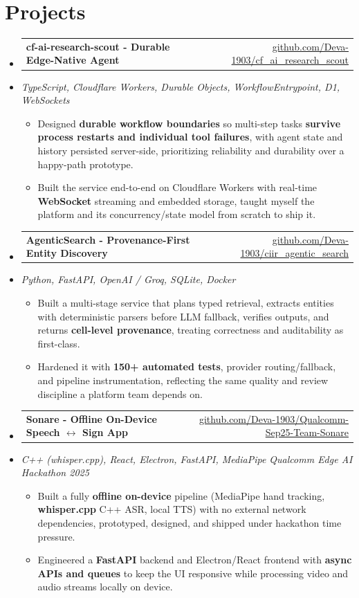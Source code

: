 \documentclass[letterpaper,10pt]{article}
\makeatletter
\newcommand{\resumeItem}[1]{
  \item\small{#1\vspace{-1pt}}
}
\newcommand{\resumeProjectHeading}[2]{
    \item
    \begin{tabular*}{0.985\textwidth}[t]{l@{\extracolsep{\fill}}r}
      \small\textbf{#1} & \small #2 \\
    \end{tabular*}\vspace{-5pt}
}
\newcommand{\resumeProjectSubheading}[1]{
  \vspace{-2pt}\item[] {\small\textcolor{ResumeSlate}{\emph{#1}}}\vspace{-3pt}
}
\newcommand{\resumeSubHeadingListStart}{\begin{itemize}[leftmargin=0.0in, label={}, itemsep=2pt, topsep=2pt]}
\newcommand{\resumeSubHeadingListEnd}{\end{itemize}}
\newcommand{\resumeItemListStart}{\begin{itemize}[leftmargin=0.18in, itemsep=2pt, topsep=1pt]}
\newcommand{\resumeItemListEnd}{\end{itemize}\vspace{-4pt}}
\makeatother
\begin{document}
\section{Projects}
\resumeSubHeadingListStart
  \resumeProjectHeading
    {cf-ai-research-scout - Durable Edge-Native Agent}
    {\href{https://github.com/Deva-1903/cf_ai_research_scout}{github.com/Deva-1903/cf\_ai\_research\_scout}}
  \resumeProjectSubheading{TypeScript, Cloudflare Workers, Durable Objects, WorkflowEntrypoint, D1, WebSockets}
    \resumeItemListStart
      \resumeItem{Designed \textbf{durable workflow boundaries} so multi-step tasks \textbf{survive process restarts and individual tool failures}, with agent state and history persisted server-side, prioritizing reliability and durability over a happy-path prototype.}
      \resumeItem{Built the service end-to-end on Cloudflare Workers with real-time \textbf{WebSocket} streaming and embedded storage, taught myself the platform and its concurrency/state model from scratch to ship it.}
    \resumeItemListEnd
  \resumeProjectHeading
    {AgenticSearch - Provenance-First Entity Discovery}
    {\href{https://github.com/Deva-1903/ciir_agentic_search}{github.com/Deva-1903/ciir\_agentic\_search}}
  \resumeProjectSubheading{Python, FastAPI, OpenAI / Groq, SQLite, Docker}
    \resumeItemListStart
      \resumeItem{Built a multi-stage service that plans typed retrieval, extracts entities with deterministic parsers before LLM fallback, verifies outputs, and returns \textbf{cell-level provenance}, treating correctness and auditability as first-class.}
      \resumeItem{Hardened it with \textbf{150+ automated tests}, provider routing/fallback, and pipeline instrumentation, reflecting the same quality and review discipline a platform team depends on.}
    \resumeItemListEnd
  \resumeProjectHeading
    {Sonare - Offline On-Device Speech \(\leftrightarrow\) Sign App}
    {\href{https://github.com/Deva-1903/Qualcomm-Sep25-Team-Sonare}{github.com/Deva-1903/Qualcomm-Sep25-Team-Sonare}}
  \resumeProjectSubheading{C++ (whisper.cpp), React, Electron, FastAPI, MediaPipe \enspace\textbar\enspace Qualcomm Edge AI Hackathon 2025}
    \resumeItemListStart
      \resumeItem{Built a fully \textbf{offline on-device} pipeline (MediaPipe hand tracking, \textbf{whisper.cpp} C++ ASR, local TTS) with no external network dependencies, prototyped, designed, and shipped under hackathon time pressure.}
      \resumeItem{Engineered a \textbf{FastAPI} backend and Electron/React frontend with \textbf{async APIs and queues} to keep the UI responsive while processing video and audio streams locally on device.}
    \resumeItemListEnd
\resumeSubHeadingListEnd
\vspace{-4pt}
\end{document}
